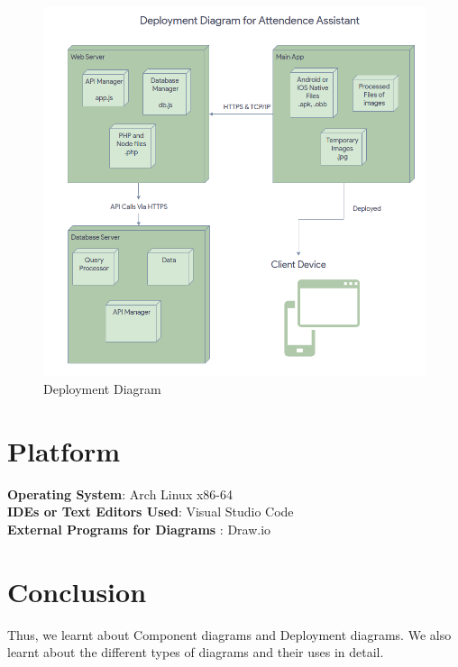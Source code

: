 \documentclass[11pt]{article}
\begin{document}
\begin{figure}[H]
	\centering
	\includegraphics[width=.95\textwidth]{Screenshot_on_2023-05-02_at_05-07-39.png}
	\caption{Deployment Diagram}
\end{figure}

\section{Platform}
\textbf{Operating System}: Arch Linux x86-64 \\
\textbf{IDEs or Text Editors Used}: Visual Studio Code\\
\textbf{External Programs for Diagrams} : Draw.io\\


\section{Conclusion}
Thus, we learnt about Component diagrams and Deployment diagrams. We also learnt about the different types of diagrams and their uses in detail.
\clearpage
\end{document}
